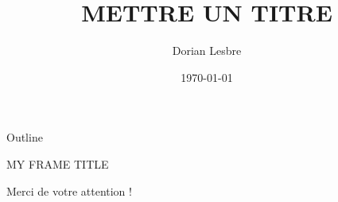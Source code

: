 \documentclass[14pt,aspectratio=169]{beamer}
\title{METTRE UN TITRE}
\author{Dorian Lesbre}
\date{\today}
\begin{document}
\begin{frame}
	\titlepage
\end{frame}

\begin{frame}{Outline}
	\tableofcontents
\end{frame}

\begin{frame}{MY FRAME TITLE}

\end{frame}


\begin{frame}
	\Large
	\begin{center}
		Merci de votre attention !
	\end{center}{}
\end{frame}
\end{document}
